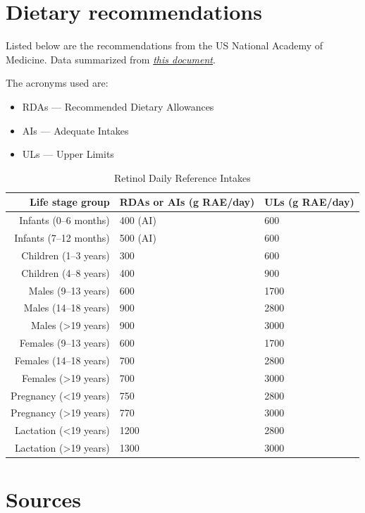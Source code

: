\documentclass{book}
\begin{document}
\section{Dietary recommendations}
Listed below are the recommendations from the US National Academy of Medicine. Data summarized from \href{https://nap.nationalacademies.org/read/10026/chapter/6}{\textit{this document}}.

The acronyms used are:
\begin{itemize}
	\item RDAs --- Recommended Dietary Allowances
	\item AIs --- Adequate Intakes
	\item ULs --- Upper Limits
\end{itemize}

\begin{table}[h]
	\caption{Retinol Daily Reference Intakes}
	\centering \begin{tabular}{| r | l | l |}
		\hline
		\textbf{Life stage group} & \textbf{RDAs or AIs (\textmu g RAE/day)} & \textbf{ULs (\textmu g RAE/day)}\\ \hline
		Infants (0--6 months) & 400 (AI) & 600\\ \hline
		Infants (7--12 months) & 500 (AI) & 600\\ \hline
		Children (1--3 years) & 300 & 600\\ \hline
		Children (4--8 years) & 400 & 900\\ \hline
		Males (9--13 years) & 600 & 1700\\ \hline
		Males (14--18 years) & 900 & 2800\\ \hline
		Males (\textgreater19 years) & 900 & 3000\\ \hline
		Females (9--13 years) & 600 & 1700\\ \hline
		Females (14--18 years) & 700 & 2800\\ \hline
		Females (\textgreater19 years) & 700 & 3000\\ \hline
		Pregnancy (\textless19 years) & 750 & 2800\\ \hline
		Pregnancy (\textgreater19 years) & 770 & 3000\\ \hline
		Lactation (\textless19 years) & 1200 & 2800\\ \hline
		Lactation (\textgreater19 years) & 1300 & 3000\\ \hline
	\end{tabular}
\end{table}
\newpage

\section{Sources}
\end{document}

